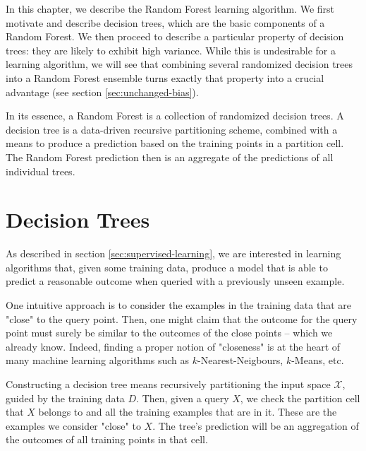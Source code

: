 \documentclass[../main.tex]{subfiles}
\begin{document}
In this chapter, we describe the Random Forest learning algorithm. We first motivate and describe decision trees, which are the basic components of a Random Forest. We then proceed to describe a particular property of decision trees: they are likely to exhibit high variance. While this is undesirable for a learning algorithm, we will see that combining several randomized decision trees into a Random Forest ensemble turns exactly that property into a crucial advantage (see section \ref{sec:unchanged-bias}).

In its essence, a Random Forest is a collection of randomized decision trees. A decision tree is a data-driven recursive partitioning scheme, combined with a means to produce a prediction based on the training points in a partition cell. The Random Forest prediction then is an aggregate of the predictions of all individual trees.

\section{Decision Trees}
\label{sec:decision-trees}

As described in section \ref{sec:supervised-learning}, we are interested in learning algorithms that, given some training data, produce a model that is able to predict a reasonable outcome when queried with a previously unseen example. 


One intuitive approach is to consider the examples in the training data that are "close" to the query point. Then, one might claim that the outcome for the query point must surely be similar to the outcomes of the close points -- which we already know. Indeed, finding a proper notion of "closeness" is at the heart of many machine learning algorithms such as $k$-Nearest-Neigbours, $k$-Means, etc.

Constructing a decision tree means recursively partitioning the input space $\mathcal{X}$, guided by the training data $D$. Then, given a query $X$, we check the partition cell that $X$ belongs to and all the training examples that are in it. These are the examples we consider "close" to $X$. The tree's prediction will be an aggregation of the outcomes of all training points in that cell. 
\end{document}
